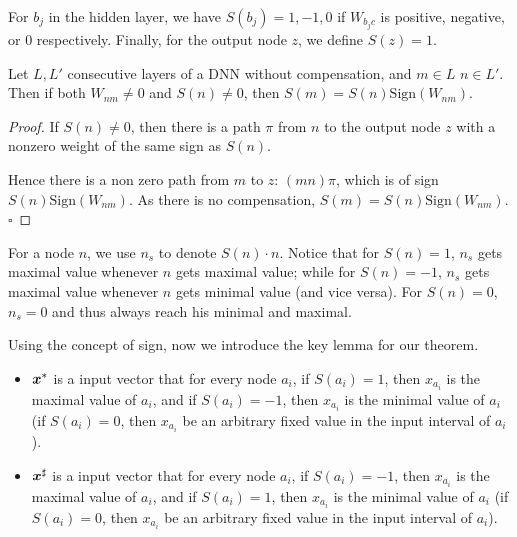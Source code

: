 For $b_j$ in the hidden layer, we have $S(b_j)=1,-1,0$ if $W_{b_j c}$ is positive, negative, or 0 respectively. Finally, for the output node $z$, we define $S(z)=1$.



\begin{lemma}[Sign]
	\label{lemma1}
	Let $L,L'$  consecutive layers of a DNN without compensation, 
	and $m\in L$ $n\in L'$. Then if both 
	$W_{nm} \neq 0$ and $S(n) \neq 0$, then 
	$S(m)=S(n)\mathrm{Sign}(W_{n m})$.
\end{lemma}

\begin{proof}
	If $S(n) \neq 0$, then there is a path $\pi$ from $n$ to the output node $z$ with a nonzero weight of the same sign as $S(n)$. 
	
	Hence there is a non zero path from $m$ to $z$: $(m n) \pi$, which is of sign 
	$S(n)\mathrm{Sign}(W_{n m})$. As there is no compensation, $S(m)=S(n)\mathrm{Sign}(W_{n m})$.
	\hfill $\square$
\end{proof}


For a node $n$, we use $n_s$ to denote $S(n)\cdot n$. 
Notice that for $S(n)=1$, $n_s$ gets maximal value whenever $n$ gets maximal value; 
while for $S(n)=-1$, $n_s$ gets maximal value whenever $n$ gets minimal value (and vice versa). For $S(n)=0$, $n_s=0$ and thus always reach his minimal and maximal.

Using the concept of sign, now we introduce the key lemma for our theorem.

\begin{definition}
	
	\begin{itemize}
		\item $\boldsymbol{x}^{*}$ is a input vector that for every node $a_i$, if $S(a_i)=1$, then $x_{a_i}$ is the maximal value of $a_i$, and if $S(a_i)=-1$, then $x_{a_i}$ is the minimal value of $a_i$ (if $S(a_i)=0$, then $x_{a_i}$ be an arbitrary fixed value in the input interval of $a_i$).
		
		\item  $\boldsymbol{x}^{\sharp}$ is a input vector that for every node $a_i$, if $S(a_i)=-1$, then $x_{a_i}$ is the maximal value of $a_i$, and if $S(a_i)=1$, then $x_{a_i}$ is the minimal value of $a_i$ (if $S(a_i)=0$, then $x_{a_i}$ be an arbitrary fixed value in the input interval of $a_i$).
	\end{itemize}
	
	
	
\end{definition}

